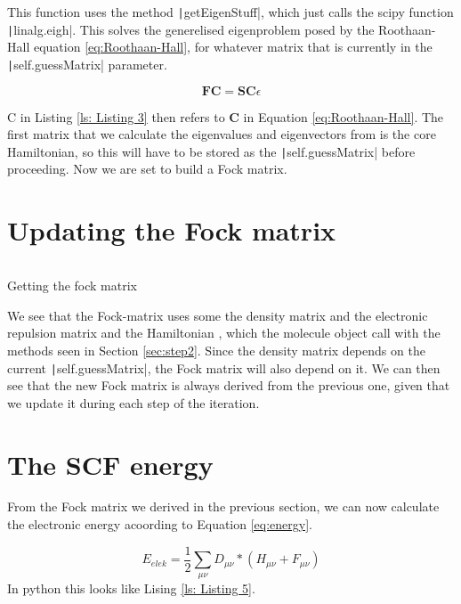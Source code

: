 \documentclass[%
    paper=A4,               %
    twoside=true,           %
    openany,              %
    parskip=full,           %
    chapterprefix=true,     %
    11pt,                   %
    headings=normal,        %
    bibliography=totoc,     %
    listof=totoc,           %
    titlepage=on,           %
    captions=tableabove,    %
    draft=false,            %
]{scrreprt}
\numberwithin{equation}{section}
\begin{document}
    This function uses the method \texttt|getEigenStuff|, which just calls the scipy function \texttt|linalg.eigh|. This solves the generelised eigenproblem posed by the Roothaan-Hall equation \eqref{eq:Roothaan-Hall}, for whatever matrix that is currently in the \texttt|self.guessMatrix| parameter.
    
    \begin{equation}\label{eq:Roothaan-Hall}
        \boldsymbol{FC} = \boldsymbol{SC}\epsilon
    \end{equation}
    
    C in Listing \ref{ls: Listing 3} then refers to \textbf{C} in Equation \eqref{eq:Roothaan-Hall}. The first matrix that we calculate the eigenvalues and eigenvectors from is the core Hamiltonian, so this will have to be stored as the \texttt|self.guessMatrix| before proceeding. Now we are set to build a Fock matrix.
    
    \section{Updating the Fock matrix}
    \label{sec:step4}
    
    \begin{listing}[ht]
        \centering
        \inputminted[firstline=119, lastline=124, autogobble]{pythonL}{.py}
        \caption{Getting the fock matrix}
        \label{ls: Listing 4}
    \end{listing}
     
     We see that the Fock-matrix uses some the density matrix and the electronic repulsion matrix and the Hamiltonian , which the molecule object call with the methods seen in Section \ref{sec:step2}. Since the density matrix depends on the current \texttt|self.guessMatrix|, the Fock matrix will also depend on it. We can then see that the new Fock matrix is always derived from the previous one, given that we update it during each step of the iteration.
     
     \section{The SCF energy}
     \label{sec:step5}
     From the Fock matrix we derived in the previous section, we can now calculate the electronic energy acoording to Equation \eqref{eq:energy}.
     
     \begin{equation} \label{eq:energy}
         E_{elek} = \frac{1}{2}\sum_{\mu\nu}D_{\mu\nu}*(H_{\mu\nu} + F_{\mu\nu})
     \end{equation}
     In python this looks like Lising \ref{ls: Listing 5}.
     
\end{document}
